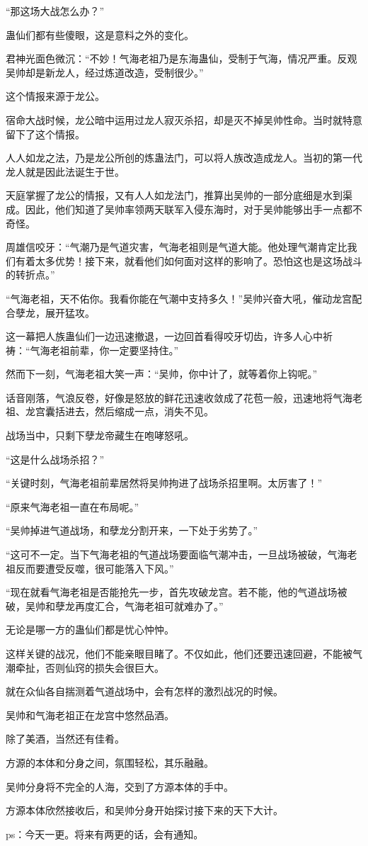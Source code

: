 \begin{this_body}
“那这场大战怎么办？”

蛊仙们都有些傻眼，这是意料之外的变化。

君神光面色微沉：“不妙！气海老祖乃是东海蛊仙，受制于气海，情况严重。反观吴帅却是新龙人，经过炼道改造，受制很少。”

这个情报来源于龙公。

宿命大战时候，龙公暗中运用过龙人寂灭杀招，却是灭不掉吴帅性命。当时就特意留下了这个情报。

人人如龙之法，乃是龙公所创的炼蛊法门，可以将人族改造成龙人。当初的第一代龙人就是因此法诞生于世。

天庭掌握了龙公的情报，又有人人如龙法门，推算出吴帅的一部分底细是水到渠成。因此，他们知道了吴帅率领两天联军入侵东海时，对于吴帅能够出手一点都不奇怪。

周雄信咬牙：“气潮乃是气道灾害，气海老祖则是气道大能。他处理气潮肯定比我们有着太多优势！接下来，就看他们如何面对这样的影响了。恐怕这也是这场战斗的转折点。”

“气海老祖，天不佑你。我看你能在气潮中支持多久！”吴帅兴奋大吼，催动龙宫配合孽龙，展开猛攻。

这一幕把人族蛊仙们一边迅速撤退，一边回首看得咬牙切齿，许多人心中祈祷：“气海老祖前辈，你一定要坚持住。”

然而下一刻，气海老祖大笑一声：“吴帅，你中计了，就等着你上钩呢。”

话音刚落，气浪反卷，好像是怒放的鲜花迅速收敛成了花苞一般，迅速地将气海老祖、龙宫囊括进去，然后缩成一点，消失不见。

战场当中，只剩下孽龙帝藏生在咆哮怒吼。

“这是什么战场杀招？”

“关键时刻，气海老祖前辈居然将吴帅拘进了战场杀招里啊。太厉害了！”

“原来气海老祖一直在布局呢。”

“吴帅掉进气道战场，和孽龙分割开来，一下处于劣势了。”

“这可不一定。当下气海老祖的气道战场要面临气潮冲击，一旦战场被破，气海老祖反而要遭受反噬，很可能落入下风。”

“现在就看气海老祖是否能抢先一步，首先攻破龙宫。若不能，他的气道战场被破，吴帅和孽龙再度汇合，气海老祖可就难办了。”

无论是哪一方的蛊仙们都是忧心忡忡。

这样关键的战况，他们不能亲眼目睹了。不仅如此，他们还要迅速回避，不能被气潮牵扯，否则仙窍的损失会很巨大。

就在众仙各自揣测着气道战场中，会有怎样的激烈战况的时候。

吴帅和气海老祖正在龙宫中悠然品酒。

除了美酒，当然还有佳肴。

方源的本体和分身之间，氛围轻松，其乐融融。

吴帅分身将不完全的人海，交到了方源本体的手中。

方源本体欣然接收后，和吴帅分身开始探讨接下来的天下大计。

ps：今天一更。将来有两更的话，会有通知。

\end{this_body}

